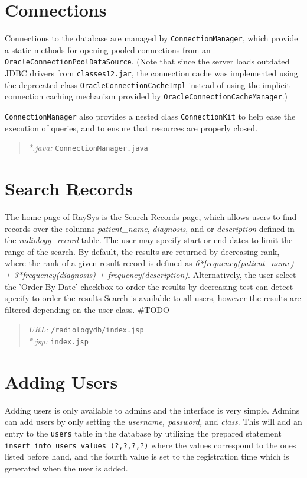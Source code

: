 \documentclass[12pt]{report}
\begin{document}
\section*{Connections}
Connections to the database are managed by \texttt{ConnectionManager}, which provide a static methods for opening pooled connections from an \texttt{OracleConnectionPoolDataSource}. (Note that since the server loads outdated JDBC drivers from \texttt{classes12.jar}, the connection cache was implemented using the deprecated class \texttt{OracleConnectionCacheImpl} instead of using the implicit connection caching mechanism provided by \texttt{OracleConnectionCacheManager}.)

\texttt{ConnectionManager} also provides a nested class \texttt{ConnectionKit} to help ease the execution of queries, and to ensure that resources are properly closed.

\begin{quote}
\emph{*.java: } \texttt{ConnectionManager.java}\\
\end{quote}
\section*{Search Records}
The home page of RaySys is the Search Records page, which allows users to find records over the columns \emph{patient\_name}, \emph{diagnosis}, and or \emph{description} defined in the \emph{radiology\_record} table. The user may specify start or end dates to limit the range of the search. By default, the results are returned by decreasing rank, where the rank of a given result record is defined as \emph{6*frequency(patient\_name) + 3*frequency(diagnosis) + frequency(description)}. Alternatively, the user select the 'Order By Date' checkbox to order the results by decreasing test can detect specify to order the results Search is available to all users, however the results are filtered depending on the user class. \#TODO

\begin{quote}
\emph{URL:} \texttt{/radiologydb/index.jsp} \\
\emph{*.jsp: } \texttt{index.jsp} \\
\end{quote}

\section*{Adding Users}
Adding users is only available to admins and the interface is very simple. Admins can add users by only setting the \emph{username, password,} and \emph{class}. This will add an entry to the \texttt{users} table in the database by utilizing the prepared statement \texttt{insert into users values (?,?,?,?)} where the values correspond to the ones listed before hand, and the fourth value is set to the registration time which is generated when the user is added.
\end{document}
